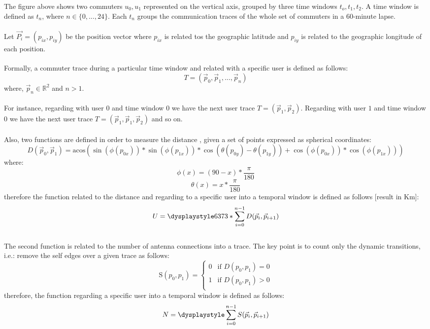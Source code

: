 The figure above shows two commuters ${u_0,u_1}$ represented on the vertical axis, grouped by three time windows $t_o,t_1,t_2$. A time window is defined as $t_n$, where $n \in \{0,...,24\}$. Each $t_n$ groups the communication traces of the whole set of commuters in a 60-minute lapse.
\\
\\
Let $\vec{P_i} = (p_{ix}, p_{iy})$ be the position vector where $p_{ix}$ is related tos the geographic latitude and $p_{iy}$ is related to the geographic longitude of each position.
\\
\\
Formally, a commuter trace during a particular time window and related with a specific user is defined as follows:
$$ T = (\vec{p}_0, \vec{p}_1, ..., \vec{p}_n)  $$ where,
$\vec{p}_n \in \mathbb{R}^2$ and $n > 1 $.
\\
\\
For instance, regarding with user $0$ and time window $0$ we have the next user trace $ T = (\vec{p}_1, \vec{p}_2)  $. Regarding with user $1$ and time window $0$ we have the next user trace $ T = (\vec{p}_1, \vec{p}_1, \vec{p}_2)  $ and so on.
\\
\\
Also, two functions are defined in order to measure the distance \citep{distance}, given a set of points expressed as spherical coordinates:
$$D(\vec{p}_0, \vec{p}_1) = \text{acos}( \sin(\phi(p_{0x})) * \sin(\phi(p_{1x})) * \cos(\theta(p_{0y}) - \theta(p_{1y})) + \cos(\phi(p_{0x})) * \cos(\phi(p_{1x})))  $$
where:
$$ \phi(x) = (90 - x) * \frac{\pi}{180}$$
$$ \theta(x) = x  * \frac{\pi}{180}$$
therefore the function related to the distance and regarding to a specific user into a temporal window is defined as follows [result in Km]:
$$U = \dysplaystyle 6373 * \sum_{i=0}^{n-1} D(\vec{p}_i, \vec{p}_{i+1}) $$
\\
The second function is related to the number of antenna connections into a trace. The key point is to count only the dynamic transitions, i.e.: remove the self edges over a given trace as follows:
\\
\begin{equation*}
\text{S}(p_0, p_1) = \left \{
\begin{matrix}
0 & \text{if } D(p_0, p_1) = 0 \\
1 & \text{if } D(p_0, p_1) > 0 \\
\end{matrix} \right.
\end{equation*}
therefore, the function regarding a specific user into a temporal window is defined as follows:
$$N = \dysplaystyle \sum_{i=0}^{n-1} S(\vec{p}_i, \vec{p}_{i+1})$$
